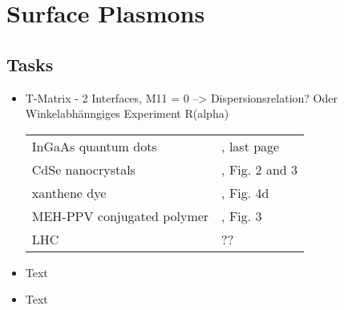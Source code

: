 \renewcommand{\chapterauthors}{Thorsten Schumacher}
\renewcommand{\lastmod}{April 15, 2020}

\chapter{Surface Plasmons}




\section{Tasks}

\begin{itemize}
\item T-Matrix - 2 Interfaces, M11 = 0 --> Dispersionsrelation?
Oder Winkelabhänngiges Experiment R(alpha)

\begin{tabular}{ll}
InGaAs quantum dots & \cite{Borri:2002p139}, last page  \\
CdSe nanocrystals & \cite{Jasieniak:2009er}, Fig. 2 and 3  \\
xanthene dye & \cite{Kastrup:2004p1737}, Fig. 4d   \\
MEH-PPV conjugated polymer  & \cite{Hou:2017jm}, Fig. 3 \\
LHC & ??  \\
\end{tabular}


\item Text
\item Text

\end{itemize}





